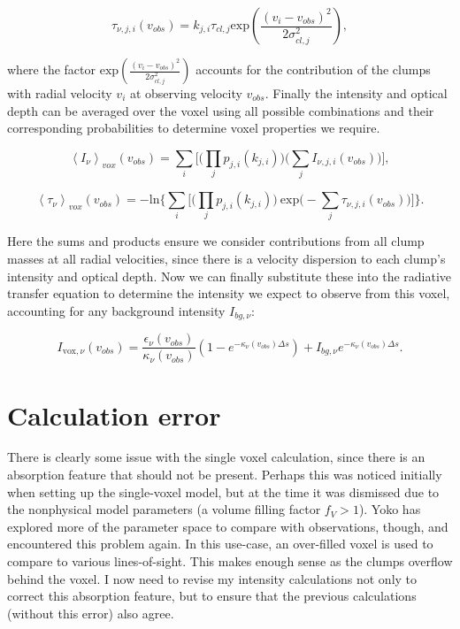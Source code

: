 \documentclass[a4paper]{article}
\begin{document}
    \[
    \tau_{\nu,j,i} (v_{obs}) = k_{j,i} \tau_{cl,j} \mathrm{exp} \left( \frac{(v_i-v_{obs})^2}{2\sigma_{cl, j}^2} \right),
    \]

    where the factor \(\mathrm{exp}(\frac{(v_i - v_{obs})^2}{2 \sigma_{cl, j}^2})\) accounts for the contribution of the clumps with radial velocity \(v_i\) at observing velocity \(v_{obs}\).
    Finally the intensity and optical depth can be averaged over the voxel using all possible combinations and their corresponding probabilities to determine voxel properties we require.

    \[
    \left< I_\nu \right>_{vox} (v_{obs}) = \sum_i \bigg[ \Big( \prod_j p_{j,i}(k_{j,i}) \Big) \Big( \sum_j I_{\nu,j,i} (v_{obs}) \Big) \bigg],
    \]

    \[
    \left< \tau_\nu \right>_{vox} (v_{obs}) = -\mathrm{ln} \Bigg\{ \sum_i \bigg[ \Big( \prod_j p_{j,i}(k_{j,i}) \Big) \ \mathrm{exp} \Big( - \sum_j \tau_{\nu,j,i} (v_{obs}) \Big) \bigg] \Bigg\}.
    \]

    Here the sums and products ensure we consider contributions from all clump masses at all radial velocities, since there is a velocity dispersion to each clump's intensity and optical depth.
    Now we can finally substitute these into the radiative transfer equation to determine the intensity we expect to observe from this voxel, accounting for any background intensity \(I_{bg, \nu}\):

    \[
    I_{\mathrm{vox},\nu} (v_{obs}) = \frac{\epsilon_\nu (v_{obs})}{\kappa_\nu (v_{obs})} \left( 1 - e^{-\kappa_\nu (v_{obs}) \Delta s} \right) + I_{bg, \nu} e^{-\kappa_\nu (v_{obs}) \Delta s}.
    \]

    \pagebreak

    \section{Calculation error}

    There is clearly some issue with the single voxel calculation, since there is an absorption feature that should not be present.
    Perhaps this was noticed initially when setting up the single-voxel model, but at the time it was dismissed due to the nonphysical model parameters (a volume filling factor \(f_V > 1\)).
    Yoko has explored more of the parameter space to compare with observations, though, and encountered this problem again.
    In this use-case, an over-filled voxel is used to compare to various lines-of-sight.
    This makes enough sense as the clumps overflow behind the voxel.
    I now need to revise my intensity calculations not only to correct this absorption feature, but to ensure that the previous calculations (without this error) also agree.
\end{document}
